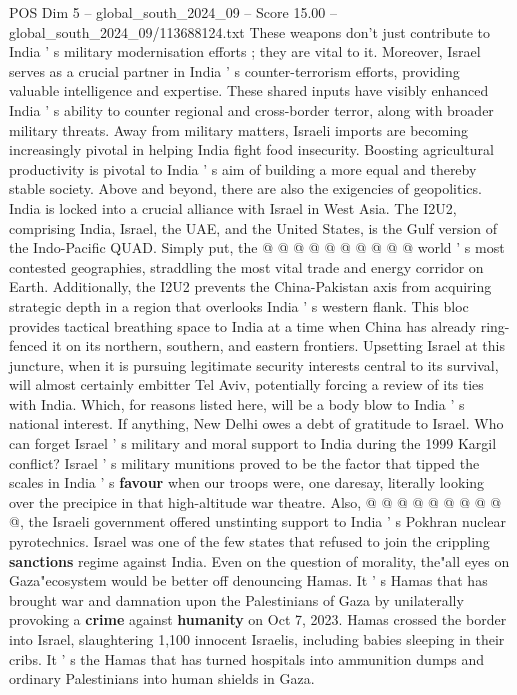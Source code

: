 \begin{textsample}{POS Dim 5 – global\_south\_2024\_09 – Score 15.00 – global\_south\_2024\_09/113688124.txt}
These weapons don't just contribute to India ' s military modernisation efforts ; they are vital to it.
Moreover, Israel serves as a crucial partner in India ' s counter-terrorism efforts, providing valuable intelligence and expertise.
These shared inputs have visibly enhanced India ' s ability to counter regional and cross-border terror, along with broader military threats.
Away from military matters, Israeli imports are becoming increasingly pivotal in helping India fight food insecurity.
Boosting agricultural productivity is pivotal to India ' s aim of building a more equal and thereby stable society.
Above and beyond, there are also the exigencies of geopolitics.
India is locked into a crucial alliance with Israel in West Asia.
The I2U2, comprising India, Israel, the UAE, and the United States, is the Gulf version of the Indo-Pacific QUAD.
Simply put, the @ @ @ @ @ @ @ @ @ @ world ' s most contested geographies, straddling the most vital trade and energy corridor on Earth.
Additionally, the I2U2 prevents the China-Pakistan axis from acquiring strategic depth in a region that overlooks India ' s western flank.
This bloc provides tactical breathing space to India at a time when China has already ring-fenced it on its northern, southern, and eastern frontiers.
Upsetting Israel at this juncture, when it is pursuing legitimate security interests central to its survival, will almost certainly embitter Tel Aviv, potentially forcing a review of its ties with India.
Which, for reasons listed here, will be a body blow to India ' s national interest.
If anything, New Delhi owes a debt of gratitude to Israel.
Who can forget Israel ' s military and moral support to India during the 1999 Kargil conflict?
Israel ' s military munitions proved to be the factor that tipped the scales in India ' s \textbf{favour} when our troops were, one daresay, literally looking over the precipice in that high-altitude war theatre.
Also, @ @ @ @ @ @ @ @ @ @, the Israeli government offered unstinting support to India ' s Pokhran nuclear pyrotechnics.
Israel was one of the few states that refused to join the crippling \textbf{sanctions} regime against India.
Even on the question of morality, the"all eyes on Gaza"ecosystem would be better off denouncing Hamas.
It ' s Hamas that has brought war and damnation upon the Palestinians of Gaza by unilaterally provoking a \textbf{crime} against \textbf{humanity} on Oct 7, 2023.
Hamas crossed the border into Israel, slaughtering 1,100 innocent Israelis, including babies sleeping in their cribs.
It ' s the Hamas that has turned hospitals into ammunition dumps and ordinary Palestinians into human shields in Gaza.

\end{textsample}
